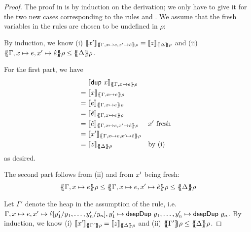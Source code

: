 \documentclass[preprint]{sigplanconf}
\theoremstyle{nonumberplain}
\newtheorem{proof}{Proof}
\begin{document}
\begin{proof}
The proof in \citep{launchbury} is by induction on the derivation; we only have to give it for the two new cases corresponding to the rules  and . We assume that the fresh variables in the rules are chosen to be undefined in $\rho$:

By induction, we know (i) $\dsem{\fresh x}{\esem{\Gamma, x \mapsto e, \fresh x \mapsto \hat e} \rho} = \dsem{z}{\esem \Delta \rho}$ and (ii) $\esem{\Gamma, x \mapsto e, \fresh x \mapsto \hat e} \rho \le \esem \Delta \rho$.

For the first part, we have 
\begin{align*}
&\phantom{{}={}}\dsem{\sDup x}{\esem{\Gamma, x\mapsto e}\rho}\\
&= \dsem{x}{\esem{\Gamma, x\mapsto e}\rho}\\
&= \dsem{e}{\esem{\Gamma, x\mapsto e}\rho}\\
&= \dsem{\hat e}{\esem{\Gamma, x\mapsto e}\rho}\\
&= \dsem{\hat e}{\esem{\Gamma, x\mapsto e, \fresh x \mapsto \hat e}\rho} && \text{$\fresh x$ fresh}\\
&= \dsem{\fresh x}{\esem{\Gamma, x\mapsto e, \fresh x \mapsto \hat e}\rho} \\
&= \dsem{z}{\esem \Delta \rho} &&\text{by (i)}
\end{align*}
as desired.

The second part follows from (ii) and from $x'$ being fresh:
\begin{align*}
\esem{\Gamma, x\mapsto e}\rho \le \esem{\Gamma, x\mapsto e, \fresh x\mapsto \hat e} \rho \le \esem{\Delta}\rho
\end{align*}

Let \mbox{$\Gamma'$} denote the heap in the assumption of the rule, i.e. $\Gamma, x\mapsto e, x'\mapsto \hat e[y'_1/y_1,\ldots,y'_n/y_n],\allowbreak y'_1 \mapsto \text{\textsf{deepDup}}\ y_1,\ldots,\allowbreak y'_n \mapsto \text{\textsf{deepDup}}\ y_n$.
By induction, we know (i) $\dsem{\fresh x}{\esem{\Gamma'} \rho} = \dsem{z}{\esem \Delta \rho}$ and (ii) $\esem{\Gamma'} \rho \le \esem \Delta \rho$.


\end{proof}
\end{document}
